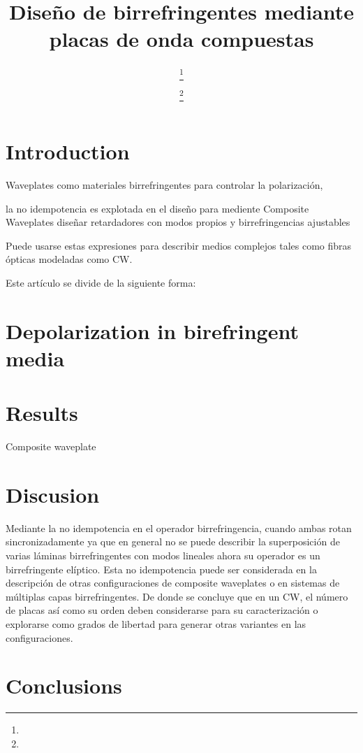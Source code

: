 \documentclass[twocolumn, A4]{webofc}
\begin{document}
%
\title{Diseño de birrefringentes mediante placas de onda compuestas}
%
%

\author{ \fnsep\thanks{} \and {}   \and {}  \and
         \fnsep\thanks{}
}


%
\maketitle
\linenumbers
\section{Introduction}\label{intro} 

Waveplates como materiales birrefringentes para controlar la polarización,

la no idempotencia es explotada en el diseño para mediente Composite Waveplates diseñar retardadores con modos propios y birrefringencias ajustables



Puede usarse estas expresiones para describir medios complejos tales como fibras ópticas modeladas como CW. 

Este artículo se divide de la siguiente forma: 

\section{Depolarization in birefringent media}\label{sec-1}
    
   
\section{Results}\label{EaR}
   Composite waveplate 

\section{Discusion}\label{Dis}
Mediante la no idempotencia en el operador birrefringencia, cuando ambas rotan sincronizadamente ya que en general no se puede describir la superposición de varias láminas birrefringentes con modos lineales  ahora su operador es un birrefringente elíptico. Esta no idempotencia puede ser considerada en la descripción de otras configuraciones de composite waveplates o en sistemas de múltiplas capas birrefringentes. De donde se concluye que en un CW, el número de placas así como su orden deben considerarse para su caracterización o explorarse como grados de libertad para generar otras variantes en las configuraciones.

\section{Conclusions}
 
%
	

\end{document}
